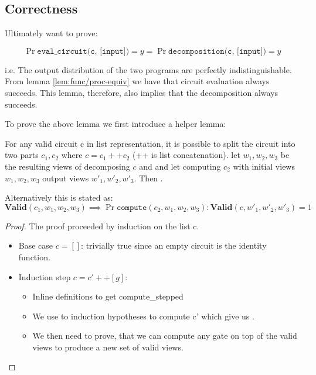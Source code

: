 \subsection{Correctness}
\label{sec:decomp_correct}
Ultimately want to prove:
\begin{lemma}
  \label{lem:decomposition_correctness}

  \[
    \Pr{\texttt{eval\_circuit(c, [input])} = y} =
    \Pr{\texttt{decomposition(c, [input])} = y}
  \]

  i.e. The output distribution of the two programs are perfectly indistinguishable. From lemma \ref{lem:func/proc-equiv} we have that circuit evaluation always succeeds. This lemma, therefore, also implies that the decomposition always succeeds.
\end{lemma}

To prove the above lemma we first introduce a helper lemma:

\begin{lemma}
  \label{lem:decompose_compute_step}
  For any valid circuit c in list representation, it is possible to split the circuit into two parts
  $c_{1}, c_{2}$ where $c = c_{1} ++ c_{2}$ (++ is list concatenation).
  let $w_{1}, w_{2}, w_{3}$ be the resulting views of decomposing $c$ and
   and let computing $c_{2}$ with initial
  views $w_{1}, w_{2}, w_{3}$ output views $w'_{1}, w'_{2}, w'_{3}$.
  Then .

  Alternatively this is stated as:
  \[
    \textbf{Valid}(c_{1}, w_{1}, w_{2}, w_{3})  \implies
    \Pr{ \texttt{compute}(c_{2}, w_{1}, w_{2}, w_{3}) : \textbf{Valid}(c, w'_{1} , w'_{2}, w'_{3}) } = 1
  \]

\end{lemma}
\begin{proof}
  The proof proceeded by induction on the list c.

  \begin{itemize}
    \item Base case $c = []$:
        trivially true since an empty circuit is the identity function.
    \item Induction step $c = c' ++ [g]$:
      \begin{itemize}
        \item Inline definitions to get compute\_stepped
        \item We use to induction hypotheses to compute c' which give us
              .
        \item We then need to prove, that we can compute any gate on top of the
          valid views to produce a new set of valid views.
      \end{itemize}
  \end{itemize}

\end{proof}

